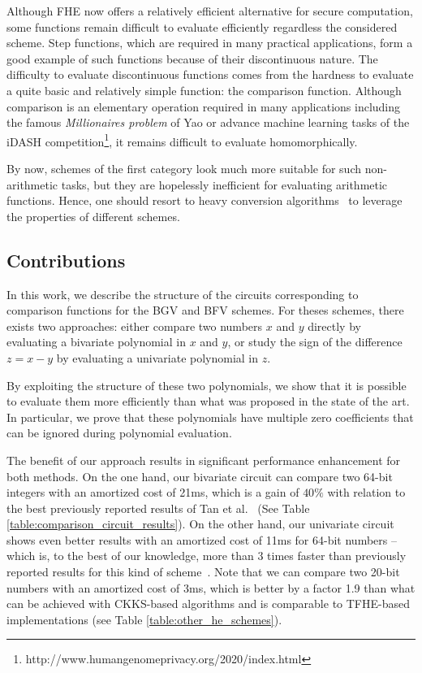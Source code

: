 Although \ac{FHE} now offers a relatively efficient alternative for secure computation, some functions remain difficult to evaluate efficiently regardless the considered scheme. 
Step functions, which are required in many practical applications, form a good example of such functions because of their discontinuous nature. 
The difficulty to evaluate discontinuous functions comes from the hardness to evaluate a quite basic and relatively simple function: the comparison function. 
Although comparison is an elementary operation required in many applications including the famous \emph{Millionaires problem} of Yao \cite{Yao82} or advance machine learning tasks of the iDASH competition\footnote{http://www.humangenomeprivacy.org/2020/index.html}, it remains difficult to evaluate homomorphically.

By now, schemes of the first category look much more suitable for such non-arithmetic tasks, but they are hopelessly inefficient for evaluating arithmetic functions.
Hence, one should resort to heavy conversion algorithms~\cite{JMC:BGGJ20} to leverage the properties of different schemes. 

\subsection{Contributions}
In this work, we describe the structure of the circuits corresponding to comparison functions for the BGV and BFV schemes. 
For theses schemes, there exists two approaches: either compare two numbers $x$ and $y$ directly by evaluating a bivariate polynomial in $x$ and $y$, or study the sign of the difference $z=x-y$ by evaluating a univariate polynomial in $z$.

By exploiting the structure of these two polynomials, we show that it is possible to evaluate them more efficiently than what was proposed in the state of the art.
In particular, we prove that these polynomials have multiple zero coefficients that can be ignored during polynomial evaluation.

The benefit of our approach results in significant performance enhancement for both methods. 
On the one hand, our bivariate circuit can compare two 64-bit integers with an amortized cost of 21ms, which is a gain of $40\%$ with relation to the best previously reported results of Tan et al.~\cite{TLWRK20} (See Table \ref{table:comparison_circuit_results}). 
On the other hand, our univariate circuit shows even better results with an amortized cost of 11ms for 64-bit numbers -- which is, to the best of our knowledge, more than 3 times faster than previously reported results for this kind of scheme~\cite{TLWRK20}. 
Note that we can compare two 20-bit numbers with an amortized cost of 3ms, which is better by a factor 1.9 than what can be achieved with CKKS-based algorithms and is comparable to TFHE-based implementations (see Table \ref{table:other_he_schemes}).

